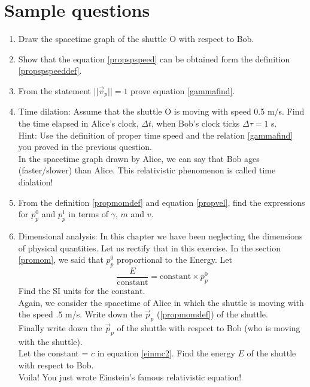 \documentclass[10pt]{article}
\begin{document}
\section{Sample questions}
\begin{enumerate}
\item Draw the spacetime graph of the shuttle O with respect to Bob.
\vspace{250px}
\item Show that the equation \ref{propspspeed} can be obtained form the definition \ref{propspspeeddef}.
\vspace{250px}
\item From the statement $||\vec{v}_p||=1$ prove equation \ref{gammafind}.
\vspace{250px}
\item Time dilation: Assume that the shuttle O is moving with speed 0.5 m/s.  Find the time elapsed in Alice's clock, $\Delta t$, when Bob's clock ticks $\Delta \tau =1$ s. \\
Hint: Use the definition of proper time speed and the relation \ref{gammafind} you proved in the previous question.
\vspace{100px}\\
In the spacetime graph drawn by Alice, we can say that Bob ages \underline{\hspace{3cm}} (faster/slower) than Alice.  This relativistic phenomenon is called time dialation!
\item From the definition \ref{propmomdef} and equation \ref{propvel}, find the expressions for $p_p^0$ and $p_p^1$ in terms of $\gamma$, $m$ and $v$.
\vspace{250px}  
\item Dimensional analysis: In this chapter we have been neglecting the dimensions of physical quantities.  Let us rectify that in this exercise.  In the section \ref{promom}, we said that $p^0_p$ proportional to the Energy.  Let
\begin{equation} 
\label{einmc2}
\frac{E}{\text{constant}}=\text{constant}\times p^0_p  
\end{equation}
Find the SI units for the $\text{constant}$.
\vspace{100px}\\
Again, we consider the spacetime of Alice in which the shuttle is moving with the speed $.5$ m/s.  Write down the $\vec{p}_p$ (\ref{propmomdef}) of the shuttle.
\vspace{100px}\\
Finally write down the $\vec{p}_p$ of the shuttle with respect to Bob (who is moving with the shuttle).
\vspace{100px}\\
Let the constant = $c$ in equation \ref{einmc2}.  Find the energy $E$ of the shuttle with respect to Bob.  
\vspace{100px}\\
Voila! You just wrote Einstein's famous relativistic equation!
\end{enumerate}
\end{document}
